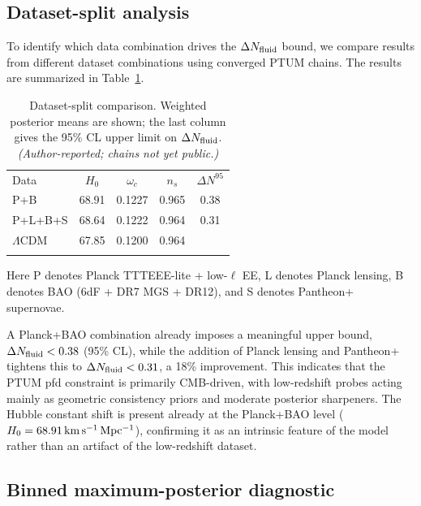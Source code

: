 \documentclass[epj]{svjour}
\begin{document}
\subsection{Dataset-split analysis}

To identify which data combination drives the
\(\Delta N_{\rm fluid}\) bound, we compare results from different
dataset combinations using converged PTUM chains. The results
are summarized in Table~\ref{tab:datasplit}.

\begin{table}
\caption{Dataset-split comparison. Weighted posterior means are
shown; the last column gives the 95\% CL upper limit on
\(\Delta N_{\rm fluid}\). \emph{(Author-reported; chains not yet
public.)}}
\label{tab:datasplit}
\centering
\small
\setlength{\tabcolsep}{3pt}
\begin{tabular}{@{}lcccc@{}}
\hline\noalign{\smallskip}
Data & \(H_0\) & \(\omega_c\) & \(n_s\) & \(\Delta N^{95}\) \\
\noalign{\smallskip}\hline\noalign{\smallskip}
P+B       & 68.91 & 0.1227 & 0.965 & 0.38 \\
P+L+B+S   & 68.64 & 0.1222 & 0.964 & 0.31 \\
\(\Lambda\)CDM & 67.85 & 0.1200 & 0.964 \\
\noalign{\smallskip}\hline
\end{tabular}
\end{table}

Here P denotes Planck TTTEEE-lite + low-\(\ell\) EE, L denotes
Planck lensing, B denotes BAO (6dF + DR7 MGS + DR12), and S
denotes Pantheon+ supernovae.

A Planck+BAO combination already imposes a meaningful upper bound,
\(\Delta N_{\rm fluid}<0.38\) (95\% CL), while the addition of
Planck lensing and Pantheon+ tightens this to
\(\Delta N_{\rm fluid}<0.31\), a 18\% improvement. This indicates
that the PTUM pfd constraint is primarily CMB-driven, with
low-redshift probes acting mainly as geometric consistency priors
and moderate posterior sharpeners. The Hubble constant shift
is present already at the Planck+BAO level
(\(H_0=68.91\,{\rm km\,s^{-1}\,Mpc^{-1}}\)), confirming it as an
intrinsic feature of the model rather than an artifact of the
low-redshift dataset.

\subsection{Binned maximum-posterior diagnostic}
\end{document}
